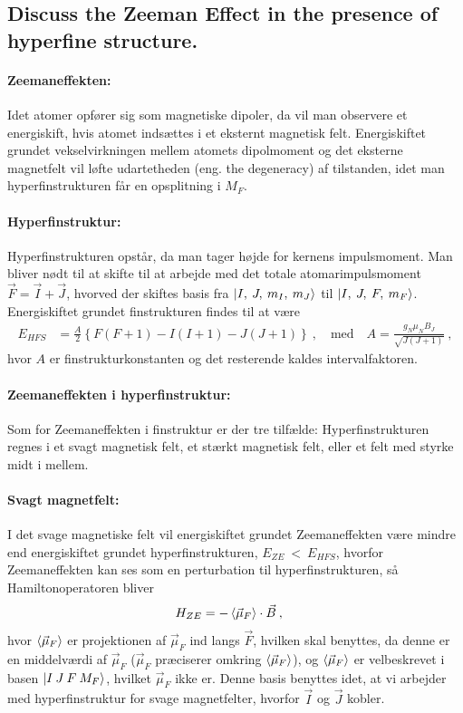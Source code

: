 \subsection{Discuss the Zeeman Effect in the presence of hyperfine structure.}


\paragraph{Zeemaneffekten:} Idet atomer opfører sig som magnetiske dipoler, da vil man observere et energiskift, hvis atomet indsættes i et eksternt magnetisk felt. Energiskiftet grundet vekselvirkningen mellem atomets dipolmoment og det eksterne magnetfelt vil løfte udartetheden (eng. the degeneracy) af tilstanden, idet man hyperfinstrukturen får en opsplitning i $M_F$.


\paragraph{Hyperfinstruktur:} Hyperfinstrukturen opstår, da man tager højde for kernens impulsmoment. Man bliver nødt til at skifte til at arbejde med det totale atomarimpulsmoment $\Vec{F} = \Vec{I} + \Vec{J}$, hvorved der skiftes basis fra $\ket{I,\: J,\: m_I,\: m_J}$ til $\ket{I,\: J,\: F,\: m_F}$. Energiskiftet grundet finstrukturen findes til at være
\begin{align}
    E_{HFS} &= \frac{A}{2}\left\{F(F+1) - I(I+1) - J(J+1)\right\} \: , \quad \text{med} \quad A = \frac{g_N \mu_N B_J}{\sqrt{J(J+1)}} \: ,
\end{align}
hvor $A$ er \textsf{finstrukturkonstanten} og det resterende kaldes \textsf{intervalfaktoren}.


\paragraph{Zeemaneffekten i hyperfinstruktur:} Som for Zeemaneffekten i finstruktur er der tre tilfælde: Hyperfinstrukturen regnes i et svagt magnetisk felt, et stærkt magnetisk felt, eller et felt med styrke midt i mellem.

\paragraph{Svagt magnetfelt:} I det svage magnetiske felt vil energiskiftet grundet Zeemaneffekten være mindre end energiskiftet grundet hyperfinstrukturen, $E_{ZE}~<~E_{HFS}$, hvorfor Zeemaneffekten kan ses som en perturbation til hyperfinstrukturen, så Hamiltonoperatoren bliver
\begin{align} \label{eq:Q17_StartudtrykForHamiltonForZeemaneffektenSvagtB}
    H_{ZE} &= - \Braket{\Vec{\mu}_F} \cdot \Vec{B} \: ,
\end{align}
hvor $\Braket{\Vec{\mu}_F}$ er projektionen af $\Vec{\mu}_F$ ind langs $\Vec{F}$, hvilken skal benyttes, da denne er en middelværdi af $\Vec{\mu}_F$ ($\Vec{\mu}_F$ præciserer omkring $\Braket{\Vec{\mu}_F}$), og $\Braket{\Vec{\mu}_F}$ er velbeskrevet i basen $\ket{I \: J \: F \: M_F}$, hvilket $\Vec{\mu}_F$ ikke er. Denne basis benyttes idet, at vi arbejder med hyperfinstruktur for svage magnetfelter, hvorfor $\Vec{I}$ og $\Vec{J}$ kobler.

